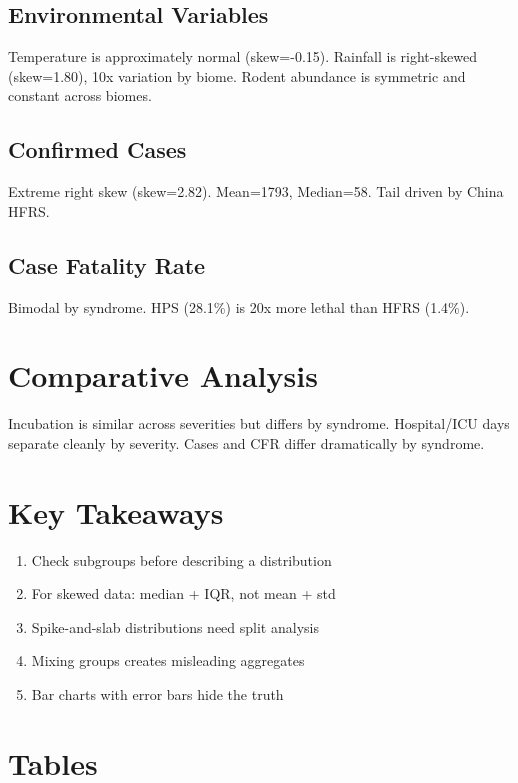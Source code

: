 \documentclass[11pt,a4paper]{article}
\begin{document}
\subsection{Environmental Variables}
Temperature is approximately normal (skew=-0.15). Rainfall is right-skewed (skew=1.80),
10x variation by biome. Rodent abundance is symmetric and constant across biomes.

\subsection{Confirmed Cases}
Extreme right skew (skew=2.82). Mean=1793, Median=58. Tail driven by China HFRS.

\subsection{Case Fatality Rate}
Bimodal by syndrome. HPS (28.1\%) is 20x more lethal than HFRS (1.4\%).

\section{Comparative Analysis}
Incubation is similar across severities but differs by syndrome. Hospital/ICU days
separate cleanly by severity. Cases and CFR differ dramatically by syndrome.

\section{Key Takeaways}
\begin{enumerate}
\item Check subgroups before describing a distribution
\item For skewed data: median + IQR, not mean + std
\item Spike-and-slab distributions need split analysis
\item Mixing groups creates misleading aggregates
\item Bar charts with error bars hide the truth
\end{enumerate}

\section{Tables}

\begin{table}[htbp]
\centering
\resizebox{\textwidth}{!}{

}
\end{table}
\end{document}
